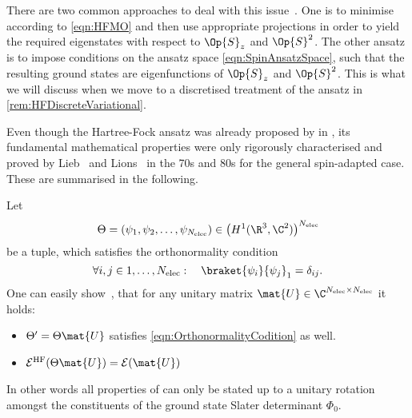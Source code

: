 \begin{rem}
	There are two common approaches to deal with this issue~\cite{McWeeny1985}.
	One is to minimise according to \eqref{eqn:HFMO}
	and then use appropriate projections in order to yield the required
	eigenstates with respect to $\Op{S}_z$ and $\Op{S}^2$.
	The other ansatz is to impose conditions
	on the ansatz space \eqref{eqn:SpinAnsatzSpace},
	such that the resulting \HF ground states
	are eigenfunctions of $\Op{S}_z$ and $\Op{S}^2$.
	This is what we will discuss when we move to a discretised
	treatment of the \HF ansatz in \vref{rem:HFDiscreteVariational}.
\end{rem}

Even though the Hartree-Fock ansatz was already proposed
by \citet{Fock1930} in \citeyear{Fock1930},
its fundamental mathematical properties were
only rigorously characterised and proved by Lieb~\cite{Lieb1977}
and Lions~\cite{Lions1987,Lions1989} in the 70s and 80s
for the general spin-adapted case.
These are summarised in the following.

\begin{rem}
	\label{rem:HFInvariance}
	Let
	\[ \Theta = \left(\psi_1, \psi_2, \ldots, \psi_{\Nelec}\right)
		\in \left(H^1(\R^3, \C^2)\right)^{\Nelec} \]
	be a tuple, which satisfies the orthonormality condition
	\begin{equation}
		\forall i,j \in 1,\ldots,\Nelec: \quad \braket{\psi_i}{\psi_j}_1 = \delta_{ij}.
		\label{eqn:OrthonormalityCodition}
	\end{equation}
	One can easily show~\cite{Lions1989},
	that for any unitary matrix $\mat{U} \in \C^{\Nelec\times\Nelec}$ it holds:
	\begin{itemize}
		\item $\Theta' = \Theta \mat{U}$ satisfies \eqref{eqn:OrthonormalityCodition} as well.
		\item $\mathcal{E}^\text{HF}(\Theta \mat{U}) = \mathcal{E}(\mat{U})$
	\end{itemize}
	In other words all properties of \HF can only be stated up to
	a unitary rotation amongst the constituents of the ground state Slater
	determinant $\Phi_0$.
\end{rem}

